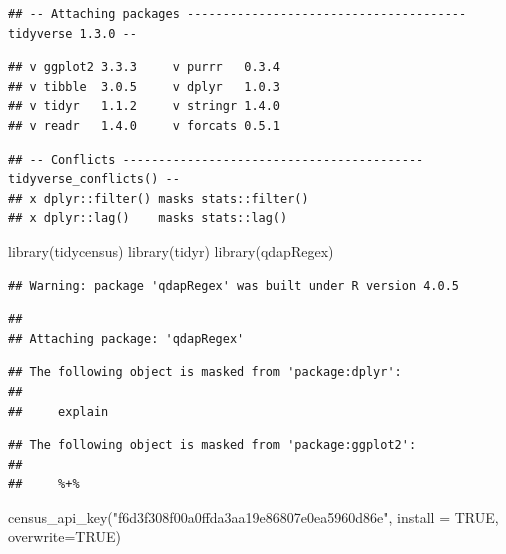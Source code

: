 \documentclass[
]{article}
\newenvironment{Shaded}{\begin{snugshade}}{\end{snugshade}}
\newcommand{\AttributeTok}[1]{\textcolor[rgb]{0.77,0.63,0.00}{#1}}
\newcommand{\ConstantTok}[1]{\textcolor[rgb]{0.00,0.00,0.00}{#1}}
\newcommand{\FunctionTok}[1]{\textcolor[rgb]{0.00,0.00,0.00}{#1}}
\newcommand{\NormalTok}[1]{#1}
\newcommand{\StringTok}[1]{\textcolor[rgb]{0.31,0.60,0.02}{#1}}
\begin{document}
\begin{verbatim}
## -- Attaching packages --------------------------------------- tidyverse 1.3.0 --
\end{verbatim}

\begin{verbatim}
## v ggplot2 3.3.3     v purrr   0.3.4
## v tibble  3.0.5     v dplyr   1.0.3
## v tidyr   1.1.2     v stringr 1.4.0
## v readr   1.4.0     v forcats 0.5.1
\end{verbatim}

\begin{verbatim}
## -- Conflicts ------------------------------------------ tidyverse_conflicts() --
## x dplyr::filter() masks stats::filter()
## x dplyr::lag()    masks stats::lag()
\end{verbatim}

\begin{Shaded}
\begin{Highlighting}[]
\FunctionTok{library}\NormalTok{(tidycensus)}
\FunctionTok{library}\NormalTok{(tidyr)}
\FunctionTok{library}\NormalTok{(qdapRegex)}
\end{Highlighting}
\end{Shaded}

\begin{verbatim}
## Warning: package 'qdapRegex' was built under R version 4.0.5
\end{verbatim}

\begin{verbatim}
## 
## Attaching package: 'qdapRegex'
\end{verbatim}

\begin{verbatim}
## The following object is masked from 'package:dplyr':
## 
##     explain
\end{verbatim}

\begin{verbatim}
## The following object is masked from 'package:ggplot2':
## 
##     %+%
\end{verbatim}

\begin{Shaded}
\begin{Highlighting}[]
\FunctionTok{census\_api\_key}\NormalTok{(}\StringTok{"f6d3f308f00a0ffda3aa19e86807e0ea5960d86e"}\NormalTok{, }\AttributeTok{install =} \ConstantTok{TRUE}\NormalTok{, }\AttributeTok{overwrite=}\ConstantTok{TRUE}\NormalTok{) }
\end{Highlighting}
\end{Shaded}
\end{document}
